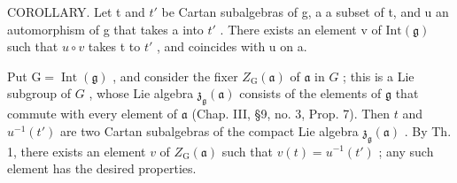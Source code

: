 COROLLARY. Let t and \(t'\) be Cartan subalgebras of g, a a subset of t, and u an automorphism of g that takes a into \(t'\) . There exists an element v of \(\text{Int}(\mathfrak{g})\) such that \(u \circ v\) takes t to \(t'\) , and coincides with u on a.

Put \(\mathrm{G} = \operatorname{Int}(\mathfrak{g})\) , and consider the fixer \(Z_{\mathrm{G}}(\mathfrak{a})\) of \(\mathfrak{a}\) in \(G\) ; this is a Lie subgroup of \(G\) , whose Lie algebra \(\mathfrak{z}_{\mathfrak{g}}(\mathfrak{a})\) consists of the elements of \(\mathfrak{g}\) that commute with every element of \(\mathfrak{a}\) (Chap. III, §9, no. 3, Prop. 7). Then \(t\) and \(u^{-1}(t')\) are two Cartan subalgebras of the compact Lie algebra \(\mathfrak{z}_{\mathfrak{g}}(\mathfrak{a})\) . By Th. 1, there exists an element \(v\) of \(Z_{\mathrm{G}}(\mathfrak{a})\) such that \(v(t) = u^{-1}(t')\) ; any such element has the desired properties.


